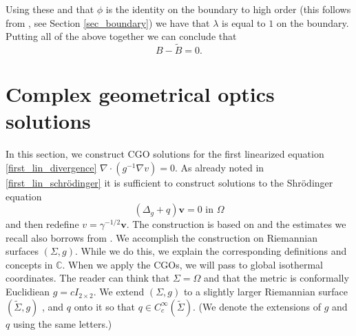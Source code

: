 \documentclass[a4paper, 10pt, twoside, notitlepage]{amsart}
\theoremstyle{plain}
\newcommand{\Om}{\Omega}
\numberwithin{equation}{section}
\newcommand {\C} {\mathbb{C}} \newcommand {\Sn} {\mathbb{S}^n}
\begin{document}
Using these and that $\phi$ is the identity on the boundary to high order (this follows from \cite[Lemma 6.1]{carstea2024calderonproblemriemanniansurfaces}, see Section \ref{sec_boundary})
we have that $\lambda$ is equal to $1$ on the boundary. Putting all of the above together we can conclude that
\begin{equation*}
	B-\tilde B = 0.
\end{equation*}


\section{Complex geometrical optics solutions}\label{sec:CGOs}
In this section, we construct
	CGO solutions for the first linearized equation \eqref{first_lin_divergence} $\nabla\cdot\left(g^{-1}\nabla v\right)=0$. As already noted in \eqref{first_lin_schrödinger} it is sufficient to construct solutions to the Shr\"odinger equation
\begin{equation*}
		(\Delta_g + q) \mathbf{v}=0  \text{ in } \Om
\end{equation*}
and then redefine $v=\gamma^{-1/2}\mathbf{v}$. 
The construction is based on \cite{guillarmou2011identification, guillarmou2011calderon} and the estimates we recall also borrows from \cite{carstea2024calderonproblemriemanniansurfaces,liimatainen2023calder}. We accomplish the construction on Riemannian surfaces $(\Sigma,g)$.  While we do this, we explain the corresponding definitions and concepts in $\C$. When we apply the CGOs, we will pass to global isothermal coordinates. The reader can think that $\Sigma=\Om$ and that the metric is conformally Euclidiean $g=cI_{2\times 2}$. We extend $(\Sigma,g)$ to a slightly larger Riemannian surface $(\widetilde \Sigma,g)$ , and $q$ onto it so that $q\in C_c^\infty(\widetilde \Sigma)$. (We denote the extensions of $g$ and $q$ using the same letters.) 
\end{document}
